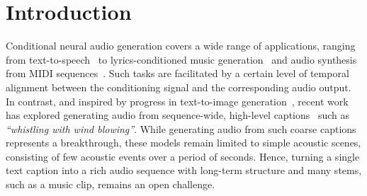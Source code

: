 \newcommand{\model}{MusicLM} %
\newcommand{\modelmv}{MusicLM-mv}
\newcommand{\dataset}{MusicCaps}
\newcommand{\datasetshort}{MusicCaps}
\newcommand{\mulan}{MuLan}
\newcommand{\audiolm}{AudioLM}
\newcommand{\soundstream}{SoundStream}
\newcommand{\dalletwo}{DALL$\cdot$E~2}
\newcommand{\mulanText}{M_T}
\newcommand{\mulanAudio}{M_A}
\newcommand{\sounds}{A}
\newcommand{\mlm}{S}

\newcommand{\mlmcodebook}{K}
\newcommand{\matchingthreshold}{\tau}
\newcommand{\memorizationpromptlen}{T}

\newcommand{\website}{https://goto.google.com/text2music-website}

\begin{abstract}

We introduce {\model}, a model for generating high-fidelity music from text descriptions such as \textit{``a~calming violin melody backed by a distorted guitar~riff''}. {\model} casts the process of conditional music generation as a hierarchical sequence-to-sequence modeling task,
and it generates music at 24~kHz that remains consistent over several minutes.
Our experiments show that {\model} outperforms previous systems both in audio quality and adherence to the text descriptions. Moreover, we demonstrate that {\model} can be conditioned on both text and a melody in that it can transform whistled and hummed melodies according to the style described in a text caption. To support future research, we publicly release {\dataset}, a dataset composed of 5.5k~music-text pairs, with rich text descriptions provided by human experts.

\small{\href{https://google-research.github.io/seanet/musiclm/examples/}{google-research.github.io/seanet/musiclm/examples}}

\end{abstract}
\section{Introduction}
\label{intro}

Conditional neural audio generation covers a wide range of applications, ranging from text-to-speech~\citep{ze2013statistical, oord2016wavenet} to lyrics-conditioned music generation~\cite{jukebox} and audio synthesis from MIDI sequences~\citep{hawthorne22_diffusion}. Such tasks are facilitated by a certain level of temporal alignment between the conditioning signal and the corresponding audio output. In contrast, and inspired by progress in text-to-image generation~\cite{dalle, dalle-2, imagen, parti}, recent work has explored generating audio from sequence-wide, high-level captions~\citep{yang2022diffsound, audiogen} such as \textit{``whistling with wind blowing''}. While generating audio from such coarse captions represents a breakthrough, these models remain limited to simple acoustic scenes, consisting of few acoustic events over a period of seconds. Hence, turning a single text caption into a rich audio sequence with long-term structure and many stems, such as a music clip, remains an open challenge.

